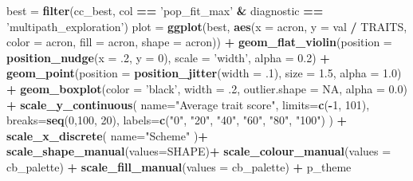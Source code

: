 \documentclass[]{book}
\newenvironment{Shaded}{\begin{snugshade}}{\end{snugshade}}
\newcommand{\DataTypeTok}[1]{\textcolor[rgb]{0.13,0.29,0.53}{#1}}
\newcommand{\DecValTok}[1]{\textcolor[rgb]{0.00,0.00,0.81}{#1}}
\newcommand{\FloatTok}[1]{\textcolor[rgb]{0.00,0.00,0.81}{#1}}
\newcommand{\KeywordTok}[1]{\textcolor[rgb]{0.13,0.29,0.53}{\textbf{#1}}}
\newcommand{\NormalTok}[1]{#1}
\newcommand{\OperatorTok}[1]{\textcolor[rgb]{0.81,0.36,0.00}{\textbf{#1}}}
\newcommand{\OtherTok}[1]{\textcolor[rgb]{0.56,0.35,0.01}{#1}}
\newcommand{\StringTok}[1]{\textcolor[rgb]{0.31,0.60,0.02}{#1}}
\begin{document}
\begin{Shaded}
\begin{Highlighting}[]
\NormalTok{best =}\StringTok{ }\KeywordTok{filter}\NormalTok{(cc_best, col }\OperatorTok{==}\StringTok{ 'pop_fit_max'} \OperatorTok{&}\StringTok{ }\NormalTok{diagnostic }\OperatorTok{==}\StringTok{ 'multipath_exploration'}\NormalTok{)}
\NormalTok{plot =}\StringTok{ }\KeywordTok{ggplot}\NormalTok{(best, }\KeywordTok{aes}\NormalTok{(}\DataTypeTok{x =}\NormalTok{ acron, }\DataTypeTok{y =}\NormalTok{ val }\OperatorTok{/}\StringTok{ }\NormalTok{TRAITS, }\DataTypeTok{color =}\NormalTok{ acron, }\DataTypeTok{fill =}\NormalTok{ acron, }\DataTypeTok{shape =}\NormalTok{ acron)) }\OperatorTok{+}
\StringTok{  }\KeywordTok{geom_flat_violin}\NormalTok{(}\DataTypeTok{position =} \KeywordTok{position_nudge}\NormalTok{(}\DataTypeTok{x =} \FloatTok{.2}\NormalTok{, }\DataTypeTok{y =} \DecValTok{0}\NormalTok{), }\DataTypeTok{scale =} \StringTok{'width'}\NormalTok{, }\DataTypeTok{alpha =} \FloatTok{0.2}\NormalTok{) }\OperatorTok{+}
\StringTok{  }\KeywordTok{geom_point}\NormalTok{(}\DataTypeTok{position =} \KeywordTok{position_jitter}\NormalTok{(}\DataTypeTok{width =} \FloatTok{.1}\NormalTok{), }\DataTypeTok{size =} \FloatTok{1.5}\NormalTok{, }\DataTypeTok{alpha =} \FloatTok{1.0}\NormalTok{) }\OperatorTok{+}
\StringTok{  }\KeywordTok{geom_boxplot}\NormalTok{(}\DataTypeTok{color =} \StringTok{'black'}\NormalTok{, }\DataTypeTok{width =} \FloatTok{.2}\NormalTok{, }\DataTypeTok{outlier.shape =} \OtherTok{NA}\NormalTok{, }\DataTypeTok{alpha =} \FloatTok{0.0}\NormalTok{) }\OperatorTok{+}
\StringTok{  }\KeywordTok{scale_y_continuous}\NormalTok{(}
    \DataTypeTok{name=}\StringTok{"Average trait score"}\NormalTok{,}
    \DataTypeTok{limits=}\KeywordTok{c}\NormalTok{(}\OperatorTok{-}\DecValTok{1}\NormalTok{, }\DecValTok{101}\NormalTok{),}
    \DataTypeTok{breaks=}\KeywordTok{seq}\NormalTok{(}\DecValTok{0}\NormalTok{,}\DecValTok{100}\NormalTok{, }\DecValTok{20}\NormalTok{),}
    \DataTypeTok{labels=}\KeywordTok{c}\NormalTok{(}\StringTok{"0"}\NormalTok{, }\StringTok{"20"}\NormalTok{, }\StringTok{"40"}\NormalTok{, }\StringTok{"60"}\NormalTok{, }\StringTok{"80"}\NormalTok{, }\StringTok{"100"}\NormalTok{)}
\NormalTok{  ) }\OperatorTok{+}
\StringTok{  }\KeywordTok{scale_x_discrete}\NormalTok{(}
    \DataTypeTok{name=}\StringTok{"Scheme"}
\NormalTok{  )}\OperatorTok{+}
\StringTok{  }\KeywordTok{scale_shape_manual}\NormalTok{(}\DataTypeTok{values=}\NormalTok{SHAPE)}\OperatorTok{+}
\StringTok{  }\KeywordTok{scale_colour_manual}\NormalTok{(}\DataTypeTok{values =}\NormalTok{ cb_palette) }\OperatorTok{+}
\StringTok{  }\KeywordTok{scale_fill_manual}\NormalTok{(}\DataTypeTok{values =}\NormalTok{ cb_palette) }\OperatorTok{+}
\StringTok{  }\NormalTok{p_theme}


\end{Highlighting}
\end{Shaded}
\end{document}
